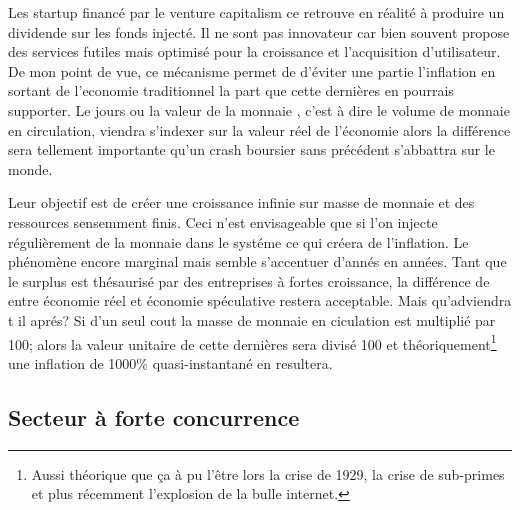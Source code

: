 \documentclass[11pt, a4paper ]{article}
\begin{document}
\begin{spacing}{1.5}
Les startup financé par le venture capitalism ce retrouve en réalité à produire un dividende sur les fonds injecté. Il ne sont pas innovateur car bien souvent propose des services futiles mais optimisé pour la croissance et l'acquisition d'utilisateur.
De mon point de vue, ce mécanisme permet de d'éviter une partie l'inflation en sortant de l'economie traditionnel la part que cette dernières en pourrais supporter. Le jours ou la valeur de la monnaie , c'est à dire le volume de monnaie en circulation, viendra s'indexer sur la valeur réel de l'économie alors la différence sera tellement importante qu'un crash boursier sans précédent s'abbattra sur le monde.

Leur objectif est de créer une croissance infinie sur masse de monnaie et des ressources sensemment finis. Ceci n'est envisageable que si l'on injecte régulièrement de la monnaie dans le systéme ce qui créera de l'inflation. Le phénomène encore marginal mais semble s'accentuer d'annés en années. Tant que le surplus est thésaurisé par des entreprises à fortes croissance, la différence de entre économie réel et économie spéculative restera acceptable.
Mais qu'adviendra t il aprés? Si d'un seul cout la masse de monnaie en ciculation est multiplié par 100; alors la valeur unitaire de cette dernières sera divisé 100 et théoriquement\footnote{Aussi théorique que ça à pu l'être lors la crise de 1929, la crise de sub-primes et plus récemment l'explosion de la bulle internet.} une inflation de 1000\% quasi-instantané en resultera.




\subsection{Secteur à forte concurrence}



\end{spacing}
\end{document}
